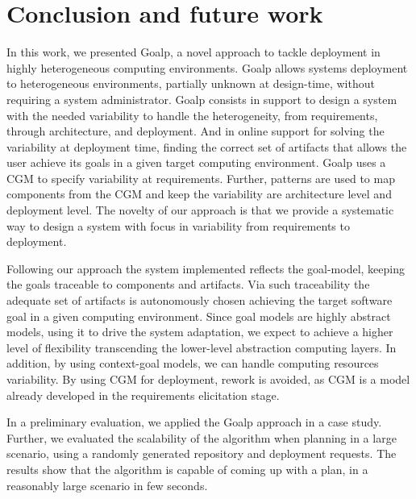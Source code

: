 \section{Conclusion and future work}
\label{sec:conclusion}

In this work, we presented Goalp, a novel approach to tackle deployment in highly heterogeneous computing environments.
Goalp allows systems deployment to heterogeneous environments, partially unknown at design-time, without requiring a system administrator.
Goalp consists in support to design a system with the needed variability to handle the heterogeneity, from requirements, through architecture, and deployment.
And in online support for solving the variability at deployment time, finding the correct set of artifacts that allows the user achieve its goals in a given target computing environment. Goalp uses a CGM to specify variability at requirements. Further, patterns are used to map components from the CGM and keep the variability are architecture level and deployment level. The novelty of our approach is that we provide a systematic way to design a system with focus in variability from requirements to deployment.

Following our approach the system implemented reflects the goal-model, keeping the goals traceable to components and artifacts. Via such traceability the adequate set of artifacts is autonomously chosen achieving the target software goal in a given computing environment. Since goal models are highly abstract models, using it to drive the system adaptation, we expect to achieve a higher level of flexibility transcending the lower-level abstraction computing layers. In addition, by using context-goal models, we can handle computing resources variability. By using CGM for deployment, rework is avoided, as CGM is a model already developed in the requirements elicitation stage.

In a preliminary evaluation, we applied the Goalp approach in a case study. Further, we evaluated the scalability of the algorithm when planning in a large scenario, using a randomly generated repository and deployment requests. The results show that the algorithm is capable of coming up with a plan, in a reasonably large scenario in few seconds.

